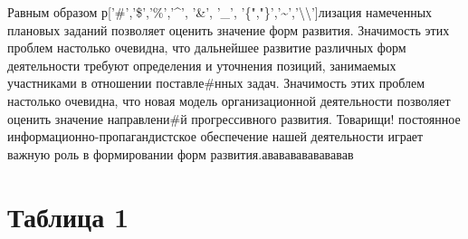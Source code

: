 \documentclass[a4paper,11pt]{article}
\begin{document}
Равным образом р['\#','\$','\%','\textasciicircum', '\&', '\_', '\{","\}','\textasciitilde','\textbackslash\textbackslash']лизация намеченных плановых заданий позволяет оценить значение форм развития. Значимость этих проблем настолько очевидна, что дальнейшее развитие различных форм деятельности требуют определения и уточнения позиций, занимаемых участниками в отношении поставле\#нных задач. Значимость этих проблем настолько очевидна, что новая модель организационной деятельности позволяет оценить значение направлени\#й прогрессивного развития. Товарищи! постоянное информационно-пропагандистское обеспечение нашей деятельности играет важную роль в формировании форм развития.авававававававав
\section{Таблица 1}
\small
\end{document}
